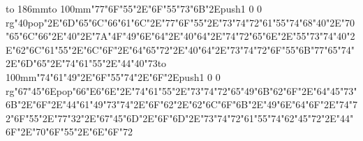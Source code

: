 \hbox to 186mm{\hsize=81mm\vbox to 100mm{\vfill\ipa\char"77\ipa\char"6F\ipa\char"55\ipa\char"2E\ipa\char"6F\ipa\char"55\ipa\char"73\ipa\char"6B\ipa\char"2E\pdfcolorstack\match push{1 0 0 rg}\ipa\char"40\pdfcolorstack\match pop{}\ipa\char"2E\ipa\char"6D\ipa\char"65\ipa\char"6C\medskip\ipa\char"66\ipa\char"61\ipa\char"6C\ipa\char"2E\ipa\char"77\ipa\char"6F\ipa\char"55\ipa\char"2E\ipa\char"73\ipa\char"74\ipa\char"72\ipa\char"61\ipa\char"55\ipa\char"74\medskip\ipa\char"68\ipa\char"40\ipa\char"2E\ipa\char"70\ipa\char"65\ipa\char"6C\ipa\char"66\ipa\char"2E\ipa\char"40\ipa\char"2E\ipa\char"7A\ipa\char"4F\ipa\char"49\ipa\char"6E\ipa\char"64\ipa\char"2E\ipa\char"40\ipa\char"64\ipa\char"2E\ipa\char"74\ipa\char"72\ipa\char"65\ipa\char"6E\ipa\char"2E\ipa\char"55\ipa\char"73\ipa\char"74\medskip\ipa\char"40\ipa\char"2E\ipa\char"62\ipa\char"6C\ipa\char"61\ipa\char"55\ipa\char"2E\ipa\char"6C\ipa\char"6F\ipa\char"2E\ipa\char"64\ipa\char"65\ipa\char"72\ipa\char"2E\ipa\char"40\ipa\char"64\ipa\char"2E\ipa\char"73\ipa\char"74\ipa\char"72\ipa\char"6F\ipa\char"55\ipa\char"6B\medskip\ipa\char"77\ipa\char"65\ipa\char"74\ipa\char"2E\ipa\char"6D\ipa\char"65\ipa\char"2E\ipa\char"74\ipa\char"61\ipa\char"55\ipa\char"2E\ipa\char"44\ipa\char"40\ipa\char"73\vfill}\hfill\vbox to 100mm{\vfill\ipa\char"74\ipa\char"61\ipa\char"49\ipa\char"2E\ipa\char"6F\ipa\char"55\ipa\char"74\ipa\char"2E\ipa\char"6F\ipa\char"2E\pdfcolorstack\match push{1 0 0 rg}\ipa\char"67\ipa\char"45\ipa\char"6E\pdfcolorstack\match pop{}\medskip\ipa\char"66\ipa\char"E6\ipa\char"6E\ipa\char"2E\ipa\char"74\ipa\char"61\ipa\char"55\ipa\char"2E\ipa\char"73\ipa\char"74\ipa\char"72\ipa\char"65\ipa\char"49\ipa\char"6B\medskip\ipa\char"62\ipa\char"6F\ipa\char"2E\ipa\char"64\ipa\char"45\ipa\char"73\ipa\char"6B\ipa\char"2E\ipa\char"6F\ipa\char"2E\ipa\char"44\ipa\char"61\ipa\char"49\ipa\char"73\ipa\char"74\ipa\char"2E\ipa\char"6F\ipa\char"62\ipa\char"2E\ipa\char"62\ipa\char"6C\ipa\char"6F\ipa\char"6B\ipa\char"2E\ipa\char"49\ipa\char"6E\ipa\char"64\medskip\ipa\char"6F\ipa\char"2E\ipa\char"74\ipa\char"72\ipa\char"6F\ipa\char"55\ipa\char"2E\ipa\char"77\ipa\char"32\ipa\char"2E\ipa\char"67\ipa\char"45\ipa\char"6D\ipa\char"2E\ipa\char"6F\ipa\char"6D\ipa\char"2E\ipa\char"73\ipa\char"74\ipa\char"72\ipa\char"61\ipa\char"55\ipa\char"74\medskip\ipa\char"62\ipa\char"45\ipa\char"72\ipa\char"2E\ipa\char"44\ipa\char"6F\ipa\char"2E\ipa\char"70\ipa\char"6F\ipa\char"55\ipa\char"2E\ipa\char"6E\ipa\char"6F\ipa\char"72\vfill}}\eject
